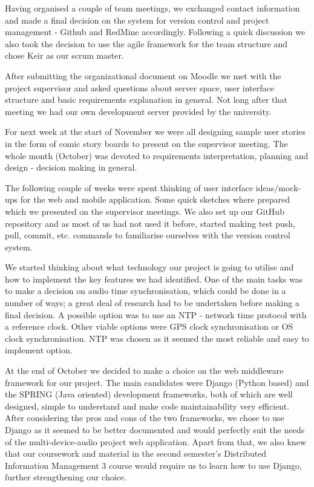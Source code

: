 \documentclass{l3proj}
\begin{document}
Having organised a couple of team meetings, we exchanged contact information and made a final decision on the system for version control and project management - Github and RedMine accordingly. Following a quick discussion we also took the decision to use the agile framework for the team structure and chose Keir as our scrum master.

After submitting the organizational document on Moodle we met with the project supervisor and asked questions about server space, user interface structure and basic requirements explanation in general. Not long after that meeting we had our own development server provided by the university.

For next week at the start of November we were all designing sample user stories in the form of comic story boards to present on the supervisor meeting. The whole month (October) was devoted to requirements interpretation, planning and design - decision making in general.

The following couple of weeks were spent thinking of user interface ideas/mock-ups for the web and mobile application. Some quick sketches where prepared which we presented on the supervisor meetings. We also set up our GitHub repository and as most of us had not used it before, started making test push, pull, commit, etc. commands to familiarise ourselves with the version control system.

We started thinking about what technology our project is going to utilise and how to implement the key features we had identified. One of the main tasks was to make a decision on audio time synchronisation, which could be done in a number of ways; a great deal of research had to be undertaken before making a final decision. A possible option was to use an NTP - network time protocol with a reference clock. Other viable options were GPS clock synchronisation or OS clock synchronisation. NTP was chosen as it seemed the most reliable and easy to implement option.

At the end of October we decided to make a choice on the web middleware framework for our project. The main candidates were Django (Python based) and the SPRING (Java oriented) development frameworks, both of which are well designed, simple to understand and make code maintainability very efficient. After considering the pros and cons of the two frameworks, we chose to use Django as it seemed to be better documented and would perfectly suit the needs of the multi-device-audio project web application. Apart from that, we also knew that our coursework and material in the second semester's Distributed Information Management 3 course would require us to learn how to use Django, further strengthening our choice.
\end{document}
